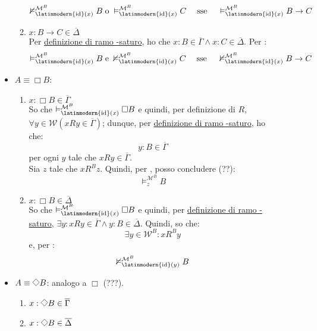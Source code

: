 \documentclass[a4paper,12pt]{article}
\newcommand{\latinmath}[1]{\text{\latinmodern{#1}}} %
\newcommand{\Dmd}{\mathord{\vcenter{\hbox{\tikz[baseline=-0.6ex]{\draw[line width=0.4pt, scale=1, rotate=45] (0,0) rectangle (0.2,0.2);}}}}} %
\begin{document}
\begin{dimo}
\begin{description}
\begin{itemize}
\begin{enumerate}
				$$\nvDash_{\latinmath{id}(x)}^{\mathcal{M}^{B}} B \; \text{o} \; \vDash_{\latinmath{id}(x)}^{\mathcal{M}^{B}} C \quad \; \text{sse} \; \quad \vDash_{\latinmath{id}(x)}^{\mathcal{M}^{B}} B \to C$$
				\item $x:B \to C \in \overline{\Delta}$ \\
				Per \hyperlink{lsat}{definizione di ramo \latinmath{L}-saturo}, ho che $x:B \in \overline{\Gamma} \land x:C \in \overline{\Delta}$. Per \latinmath{IH}:
				$$\vDash_{\latinmath{id}(x)}^{\mathcal{M}^{B}} B \; \text{e} \; \nvDash_{\latinmath{id}(x)}^{\mathcal{M}^{B}} C \quad \; \text{sse} \; \quad \nvDash_{\latinmath{id}(x)}^{\mathcal{M}^{B}} B \to C$$
			\end{enumerate}
			\item $A \equiv \Box B$:
			\begin{enumerate}
				\item $x: \Box B \in \overline{\Gamma}$ \\
				So che $\vDash_{\latinmath{id}(x)}^{\mathcal{M}^{B}} \Box B$ e quindi, per definizione di $R$, $\forall y \in \mathcal{W} (xRy \in \overline{\Gamma})$; dunque, per \hyperlink{lsat}{definizione di ramo \latinmath{L}-saturo}, ho che:
				$$y:B \in \overline{\Gamma}$$
				per ogni $y$ tale che $xRy \in \overline{\Gamma}$. \\
				Sia $z$ tale che $xR^Bz$. Quindi, per \latinmath{IH}, posso concludere (??): 
				$$\vDash_z^{\mathcal{M}^{B}} B$$
				\item $x: \Box B \in \overline{\Delta}$ \\
				So che $\vDash_{\latinmath{id}(x)}^{\mathcal{M}^{B}} \Box B$ e quindi, per \hyperlink{lsat}{definizione di ramo \latinmath{L}-saturo}, $\exists y : xRy \in \overline{\Gamma} \land y:B \in \overline{\Delta}$. Quindi, so che: 
				$$\exists y \in \mathcal{W}^{B} : xR^By$$
				e, per \latinmath{IH}:
				$$\nvDash_{\latinmath{id}(y)}^{\mathcal{M}^{B}} B $$ 
			\end{enumerate}
			\item $A \equiv \Dmd B$: analogo a $\Box$ (???).
			\begin{enumerate}
				\item $x: \Dmd B \in \overline{\Gamma}$ 
				\item $x: \Dmd B \in \overline{\Delta}$ \\
			\end{enumerate}
		\end{itemize}
	\end{description}
\end{dimo}
\end{document}
